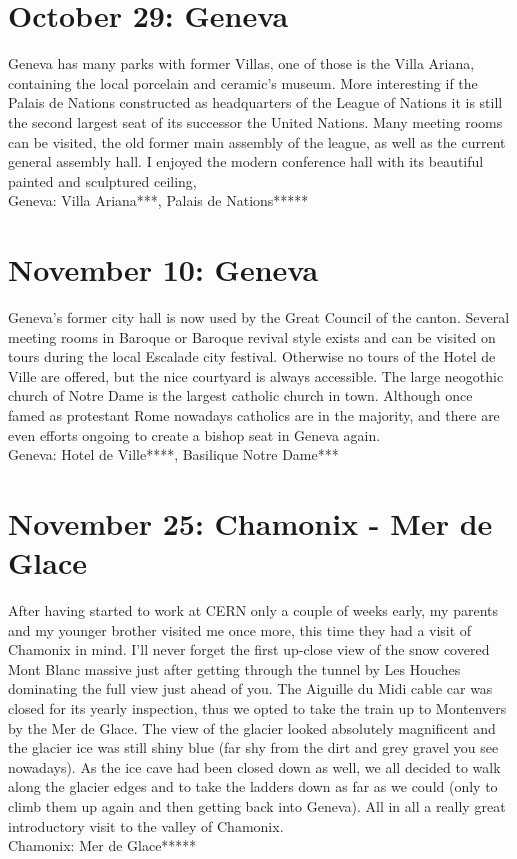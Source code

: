 \section{October 29: Geneva}
\label{2006:GenevaII}

Geneva has many parks with former Villas, one of those is the Villa Ariana, containing the local porcelain and ceramic's museum. More interesting if the Palais de Nations constructed as headquarters of the League of Nations it is still the second largest seat of its successor the United Nations. Many meeting rooms can be visited, the old former main assembly of the league, as well as the current general assembly hall. I enjoyed the modern conference hall with its beautiful painted and sculptured ceiling,\\

Geneva: Villa Ariana***, Palais de Nations*****

\section{November 10: Geneva}
\label{2006:GenevaIII}

Geneva's former city hall is now used by the Great Council of the canton. Several meeting rooms in Baroque or Baroque revival style exists and can be visited on tours during the local Escalade city festival. Otherwise no tours of the Hotel de Ville are offered, but the nice courtyard is always accessible. The large neogothic church of Notre Dame is the largest catholic church in town. Although once famed as protestant Rome nowadays catholics are in the majority, and there are even efforts ongoing to create a bishop seat in Geneva again.\\

Geneva: Hotel de Ville****, Basilique Notre Dame***

\section{November 25: Chamonix - Mer de Glace}
\label{2006:Chamonix}

After having started to work at CERN only a couple of weeks early, my parents and my younger brother visited me once more, this time they had a visit of Chamonix in mind. I'll never forget the first up-close view of the snow covered Mont Blanc massive just after getting through the tunnel by Les Houches dominating the full view just ahead of you. The Aiguille du Midi cable car was closed for its yearly inspection, thus we opted to take the train up to Montenvers by the Mer de Glace. The view of the glacier looked absolutely magnificent and the glacier ice was still shiny blue (far shy from the dirt and grey gravel you see nowadays). As the ice cave had been closed down as well, we all decided to walk along the glacier edges and to take the ladders down as far as we could (only to climb them up again and then getting back into Geneva). All in all a really great introductory visit to the valley of Chamonix.\\

Chamonix: Mer de Glace*****\\
